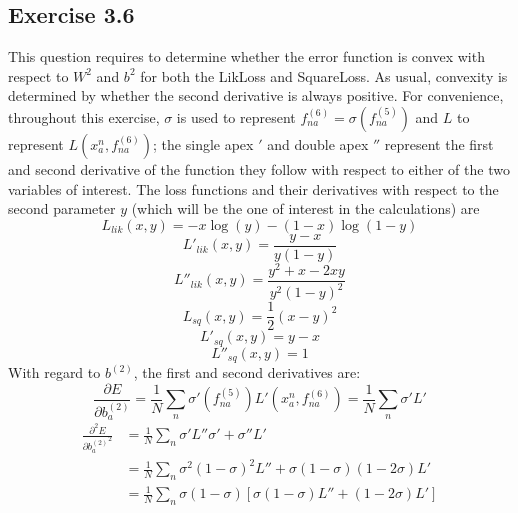 \documentclass[fleqn]{report}
\begin{document}
\subsection*{Exercise 3.6}
This question requires to determine whether the error function is convex with respect to $W^2$ and $b^2$ for both the LikLoss and SquareLoss. As usual, convexity is determined by whether the second derivative is always positive. For convenience, throughout this exercise, $\sigma$ is used to represent $f^{(6)}_{na} = \sigma \left ( f^{(5)}_{na} \right )$ and $L$ to represent $L \left(x^n_a, f^{(6)}_{na}\right)$; the single apex $'$ and double apex $''$ represent the first and second derivative of the function they follow with respect to either of the two variables of interest. The loss functions and their derivatives with respect to the second parameter $y$ (which will be the one of interest in the calculations) are
\begin{equation}
    L_{lik}(x, y) = - x \log ( y ) - (1-x)\log(1-y)
\end{equation}
\begin{equation}
    L'_{lik}(x, y) = \frac{y-x}{y(1-y)}
\end{equation}
\begin{equation}
    L''_{lik}(x, y) = \frac{y^2+x-2xy}{y^2(1-y)^2}
\end{equation}
\begin{equation}
    L_{sq}(x, y) = \frac{1}{2} (x -  y)^2
\end{equation}
\begin{equation}
    L'_{sq}(x, y) = y - x
\end{equation}
\begin{equation}
    L''_{sq}(x, y) = 1
\end{equation}
With regard to $b^{(2)}$, the first and second derivatives are:
\begin{equation}
    \frac{\partial E}{\partial b^{(2)}_{a}} = \frac{1}{N} \sum_n \sigma'\left(f^{(5)}_{na}\right) L'\left(x^n_a, f^{(6)}_{na}\right) = \frac{1}{N} \sum_n \sigma' L'
\end{equation}
\begin{equation}
    \begin{split}
        \frac{\partial^2 E}{\partial {b^{(2)}_{a}}^2} & =
        \frac{1}{N} \sum_n \sigma'L''\sigma' + \sigma''L' \\
        & = \frac{1}{N} \sum_n \sigma^2 (1-\sigma)^2 L'' + \sigma (1-\sigma)(1-2\sigma) L' \\
        & = \frac{1}{N} \sum_n \sigma (1-\sigma)[\sigma(1-\sigma)L'' + (1-2\sigma)L']
    \end{split}
\end{equation}
\end{document}
